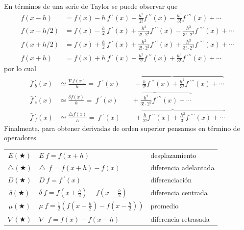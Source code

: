 \documentclass[spanish,titlepage,11pt]{article}
\begin{document}
En t\'{e}rminos de una serie de Taylor se puede observar que
\begin{align*}
f(x-h)  &  =f(x)-h\ f\ ^{\prime}(x)+\frac{h^{2}}{2!}f\ ^{\prime\prime
}(x)-\frac{h^{3}}{3!}f\ ^{\prime\prime\prime}(x)+\cdots\\
f(x-h/2)  &  =f(x)-\frac{h}{2}\ f\ ^{\prime}(x)+\frac{h^{2}}{2!\cdot2^{2}%
}f\ ^{\prime\prime}(x)-\frac{h^{3}}{3!\cdot2^{3}}f\ ^{\prime\prime\prime
}(x)+\cdots\\
f(x+h/2)  &  =f(x)+\frac{h}{2}\ f\ ^{\prime}(x)+\frac{h^{2}}{2!\cdot2^{2}%
}f\ ^{\prime\prime}(x)+\frac{h^{3}}{3!\cdot2^{3}}f\ ^{\prime\prime\prime
}(x)+\cdots\\
f(x+h)  &  =f(x)+h\ f\ ^{\prime}(x)+\frac{h^{2}}{2!}f\ ^{\prime\prime
}(x)+\frac{h^{3}}{3!}f\ ^{\prime\prime\prime}(x)+\cdots
\end{align*}
por lo cual
\begin{align*}
\bar{f}\ _{b}^{\prime}(x)  &  \simeq\frac{\nabla f(x)}{h}=\ f\ ^{\prime
}(x)\overbrace{\qquad-\frac{h}{2!}f\ ^{\prime\prime}(x)+\frac{h^{2}}%
{3!}f\ ^{\prime\prime\prime}(x)+\cdots}\\
\bar{f}\ _{c}^{\prime}(x)  &  \simeq\frac{\delta f(x)}{h}=\ f\ ^{\prime
}(x)\overbrace{\qquad+\frac{h^{2}}{3!\cdot2^{2}}f\ ^{\prime\prime\prime
}(x)+\cdots}\\
\bar{f}\ _{f}^{\prime}(x)  &  \simeq\frac{\triangle f(x)}{h}=\ f\ ^{\prime
}(x)\overbrace{\qquad+\frac{h}{2!}f\ ^{\prime\prime}(x)+\frac{h^{2}}%
{3!}f\ ^{\prime\prime\prime}(x)+\cdots}%
\end{align*}
Finalmente, para obtener derivadas de orden superior pensamos en t\'{e}rmino
de operadores

\begin{center}%
\begin{tabular}
[c]{cll}%
$E(\bigstar)$ & $E\ f=f(x+h)$ & desplazamiento\\
$\triangle(\bigstar)$ & $\triangle\ \ f=f(x+h)-f(x)$ & diferencia adelantada\\
$D(\bigstar)$ & $D\ f=f\ ^{\prime}(x)$ & diferenciaci\'{o}n\\
$\delta(\bigstar)$ & $\delta\ f=f\left(  x+\frac{h}{2}\right)  -f\left(
x-\frac{h}{2}\right)  $ & diferencia centrada\\
$\mu(\bigstar)$ & $\mu\ f=\frac{1}{2}\left(  f\left(  x+\frac{h}{2}\right)
-f\left(  x-\frac{h}{2}\right)  \right)  $ & promedio\\
$\nabla(\bigstar)$ & $\nabla\ \ f=f(x)-f(x-h)$ & diferencia retrasada
\end{tabular}
\end{center}
\end{document}
